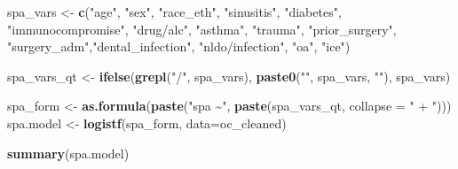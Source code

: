 \documentclass[
]{article}
\newenvironment{Shaded}{\begin{snugshade}}{\end{snugshade}}
\newcommand{\AttributeTok}[1]{\textcolor[rgb]{0.13,0.29,0.53}{#1}}
\newcommand{\FunctionTok}[1]{\textcolor[rgb]{0.13,0.29,0.53}{\textbf{#1}}}
\newcommand{\NormalTok}[1]{#1}
\newcommand{\OtherTok}[1]{\textcolor[rgb]{0.56,0.35,0.01}{#1}}
\newcommand{\StringTok}[1]{\textcolor[rgb]{0.31,0.60,0.02}{#1}}
\begin{document}
\begin{Shaded}
\begin{Highlighting}[]
\NormalTok{spa\_vars }\OtherTok{\textless{}{-}} \FunctionTok{c}\NormalTok{(}\StringTok{"age"}\NormalTok{, }\StringTok{"sex"}\NormalTok{, }\StringTok{"race\_eth"}\NormalTok{, }\StringTok{"sinusitis"}\NormalTok{, }\StringTok{"diabetes"}\NormalTok{,}
              \StringTok{"immunocompromise"}\NormalTok{, }\StringTok{"drug/alc"}\NormalTok{, }\StringTok{"asthma"}\NormalTok{, }\StringTok{"trauma"}\NormalTok{, }
              \StringTok{"prior\_surgery"}\NormalTok{, }\StringTok{"surgery\_adm"}\NormalTok{,}\StringTok{"dental\_infection"}\NormalTok{,}
              \StringTok{"nldo/infection"}\NormalTok{, }\StringTok{"oa"}\NormalTok{, }\StringTok{"ice"}\NormalTok{)}

\NormalTok{spa\_vars\_qt }\OtherTok{\textless{}{-}} \FunctionTok{ifelse}\NormalTok{(}\FunctionTok{grepl}\NormalTok{(}\StringTok{"/"}\NormalTok{, spa\_vars), }
                      \FunctionTok{paste0}\NormalTok{(}\StringTok{"\textasciigrave{}"}\NormalTok{, spa\_vars, }\StringTok{"\textasciigrave{}"}\NormalTok{), spa\_vars)}

\NormalTok{spa\_form }\OtherTok{\textless{}{-}} \FunctionTok{as.formula}\NormalTok{(}\FunctionTok{paste}\NormalTok{(}\StringTok{"spa \textasciitilde{}"}\NormalTok{, }\FunctionTok{paste}\NormalTok{(spa\_vars\_qt, }\AttributeTok{collapse =} \StringTok{" + "}\NormalTok{)))}
\NormalTok{spa.model }\OtherTok{\textless{}{-}} \FunctionTok{logistf}\NormalTok{(spa\_form, }\AttributeTok{data=}\NormalTok{oc\_cleaned)}

\FunctionTok{summary}\NormalTok{(spa.model)}
\end{Highlighting}
\end{Shaded}
\end{document}
